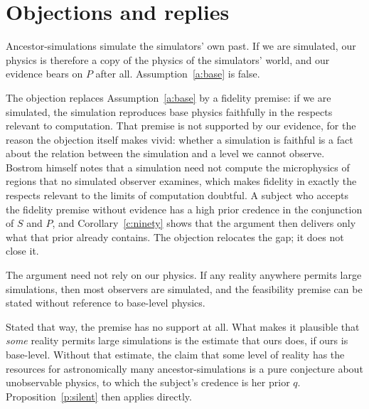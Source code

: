 \documentclass{situationist-preprint}
\begin{document}
\section{Objections and replies}

\begin{objection}
Ancestor-simulations simulate the simulators' own past. If we are simulated, our physics is therefore a copy of the physics of the simulators' world, and our evidence bears on $P$ after all. Assumption~\ref{a:base} is false.
\end{objection}

\begin{reply}
The objection replaces Assumption~\ref{a:base} by a fidelity premise: if we are simulated, the simulation reproduces base physics faithfully in the respects relevant to computation. That premise is not supported by our evidence, for the reason the objection itself makes vivid: whether a simulation is faithful is a fact about the relation between the simulation and a level we cannot observe. Bostrom himself notes that a simulation need not compute the microphysics of regions that no simulated observer examines, which makes fidelity in exactly the respects relevant to the limits of computation doubtful. A subject who accepts the fidelity premise without evidence has a high prior credence in the conjunction of $S$ and $P$, and Corollary~\ref{c:ninety} shows that the argument then delivers only what that prior already contains. The objection relocates the gap; it does not close it.
\end{reply}

\begin{objection}
The argument need not rely on our physics. If any reality anywhere permits large simulations, then most observers are simulated, and the feasibility premise can be stated without reference to base-level physics.
\end{objection}

\begin{reply}
Stated that way, the premise has no support at all. What makes it plausible that \emph{some} reality permits large simulations is the estimate that ours does, if ours is base-level. Without that estimate, the claim that some level of reality has the resources for astronomically many ancestor-simulations is a pure conjecture about unobservable physics, to which the subject's credence is her prior $q$. Proposition~\ref{p:silent} then applies directly.
\end{reply}
\end{document}
